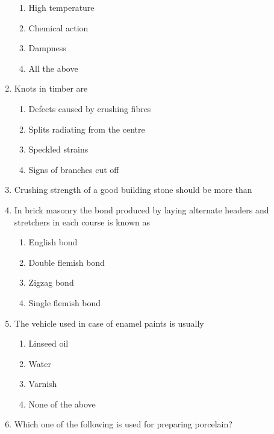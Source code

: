 \documentclass[11pt,a4paper]{article}
\begin{document}
\begin{enumerate}
\begin{enumerate}[label=\Alph*.]
\item{High temperature}
\item{Chemical action}
\item{Dampness}
\item{All the above}
\end{enumerate}
\item{Knots in timber are}
\begin{enumerate}[label=\Alph*.]
\item{Defects caused by crushing fibres}
\item{Splits radiating from the centre}
\item{Speckled strains}
\item{Signs of branches cut off}
\end{enumerate}
\item{Crushing strength of a good building stone should be more than}
\\
\item{In brick masonry the bond produced by laying alternate headers and stretchers in each course is known as}
\begin{enumerate}[label=\Alph*.]
\item{English bond}
\item{Double flemish bond}
\item{Zigzag bond}
\item{Single flemish bond}
\end{enumerate}
\item{The vehicle used in case of enamel paints is usually}
\begin{enumerate}[label=\Alph*.]
\item{Linseed oil}
\item{Water}
\item{Varnish}
\item{None of the above}
\end{enumerate}
\item{Which one of the following is used for preparing porcelain?}
\\\begin{enumerate*}[itemjoin=\qquad, label=\Alph*.]

\end{enumerate*}
\end{enumerate}
\end{document}
